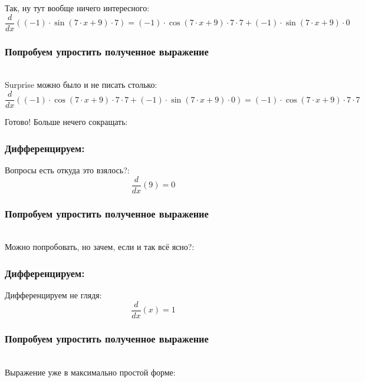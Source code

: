\documentclass[a4paper,12pt]{article}
\begin{document}
Так, ну тут вообще ничего интересного:
\begin{dmath}\frac{d}{dx}\left((-1)\cdot \operatorname{sin}\left(7\cdot x+ 9\right) \cdot 7\right)=(-1)\cdot \operatorname{cos}\left(7\cdot x+ 9\right) \cdot 7\cdot 7+ (-1)\cdot \operatorname{sin}\left(7\cdot x+ 9\right) \cdot 0\end{dmath}
\subsubsection*{Попробуем упростить полученное выражение}
\\Surprise можно было и не писать столько:\\
\begin{dmath}
	\frac{d}{dx}\left((-1)\cdot \operatorname{cos}\left(7\cdot x+ 9\right) \cdot 7\cdot 7+ (-1)\cdot \operatorname{sin}\left(7\cdot x+ 9\right) \cdot 0\right) = (-1)\cdot \operatorname{cos}\left(7\cdot x+ 9\right) \cdot 7\cdot 7\end{dmath}

Готово! Больше нечего сокращать:

\subsubsection*{Дифференцируем:}

Вопросы есть откуда это взялось?:
\begin{dmath}\frac{d}{dx}\left(9\right)=0\end{dmath}
\subsubsection*{Попробуем упростить полученное выражение}
\\Можно попробовать, но зачем, если и так всё ясно?:

\subsubsection*{Дифференцируем:}

Дифференцируем не глядя:
\begin{dmath}\frac{d}{dx}\left(x\right)=1\end{dmath}
\subsubsection*{Попробуем упростить полученное выражение}
\\Выражение уже в максимально простой форме:
\end{document}
